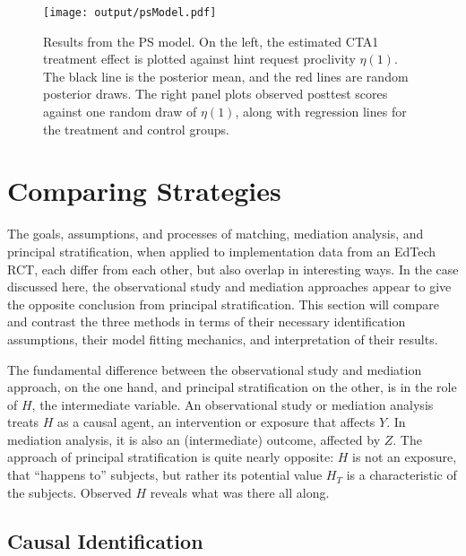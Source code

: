 \documentclass{article}\usepackage[]{graphicx}\usepackage[]{color}
\begin{document}
\begin{figure}
\centering
\texttt{[image: output/psModel.pdf]}
\caption{Results from the PS model. On the left, the estimated
  CTA1 treatment effect is plotted against hint request proclivity
  $\eta(1)$. The black line is the posterior mean, and the red lines
  are random posterior draws. The right panel plots observed posttest
  scores against one random draw of $\eta(1)$, along with regression
  lines for the treatment and control groups.}
\label{fig:psResults}
\end{figure}


\section{Comparing Strategies}\label{sec:synthesis}
The goals, assumptions, and processes of matching, mediation analysis,
and principal stratification, when applied to implementation data from
an EdTech RCT, each differ from each other, but also overlap in
interesting ways.
In the case discussed here, the observational study and mediation
approaches appear to give the opposite conclusion from principal
stratification.
This section will compare and contrast the three methods in terms of
 their necessary identification assumptions, their model fitting
 mechanics, and interpretation of their results.

The fundamental difference between the observational study and
mediation approach, on the one hand, and principal stratification on
the other, is in the role of $H$, the intermediate variable.
An observational study or mediation analysis treats $H$ as a causal
agent, an intervention or exposure that affects $Y$.
In mediation analysis, it is also an (intermediate) outcome, affected
by $Z$.
The approach of principal stratification is quite nearly opposite:
$H$ is not an exposure, that ``happens to'' subjects, but rather its
potential value $H_T$ is a characteristic of the subjects.
Observed $H$ reveals what was there all along.


\subsection{Causal Identification}
\end{document}
